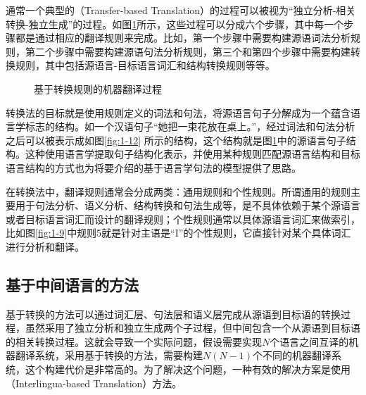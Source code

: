 \parinterval 通常一个典型的{\small{}}（Transfer-based Translation）的过程可以被视为“独立分析-相关转换-独立生成”的过程。如图\ref{fig:1-11}所示，这些过程可以分成六个步骤，其中每一个步骤都是通过相应的翻译规则来完成。比如，第一个步骤中需要构建源语词法分析规则，第二个步骤中需要构建源语句法分析规则，第三个和第四个步骤中需要构建转换规则，其中包括源语言-目标语言词汇和结构转换规则等等。

\begin{figure}[htp]
    \centering

    \caption{基于转换规则的机器翻译过程}
    \label{fig:1-11}
\end{figure}

\parinterval 转换法的目标就是使用规则定义的词法和句法，将源语言句子分解成为一个蕴含语言学标志的结构。如一个汉语句子“她把一束花放在桌上。”，经过词法和句法分析之后可以被表示成如图\ref{fig:1-12} 所示的结构，这个结构就是图\ref{fig:1-11}中的源语言句子结构。这种使用语言学提取句子结构化表示，并使用某种规则匹配源语言结构和目标语言结构的方式也为{\chaptereight}将要介绍的基于语言学句法的模型提供了思路。

\parinterval 在转换法中，翻译规则通常会分成两类：通用规则和个性规则。所谓通用的规则主要用于句法分析、语义分析、结构转换和句法生成等，是不具体依赖于某个源语言或者目标语言词汇而设计的翻译规则；个性规则通常以具体源语言词汇来做索引，比如图\ref{fig:1-9}中规则5就是针对主语是“I”的个性规则，它直接针对某个具体词汇进行分析和翻译。


\subsection{基于中间语言的方法}

\parinterval 基于转换的方法可以通过词汇层、句法层和语义层完成从源语到目标语的转换过程，虽然采用了独立分析和独立生成两个子过程，但中间包含一个从源语到目标语的相关转换过程。这就会导致一个实际问题，假设需要实现$N$个语言之间互译的机器翻译系统，采用基于转换的方法，需要构建$N(N-1)$个不同的机器翻译系统，这个构建代价是非常高的。为了解决这个问题，一种有效的解决方案是使用{\small{}}（Interlingua-based Translation）方法。

